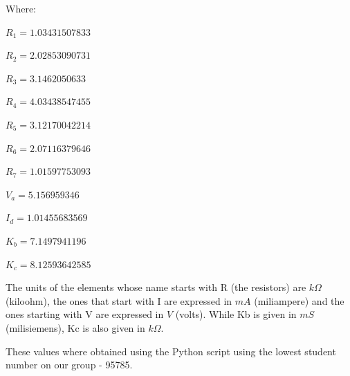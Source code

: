 \begin{center}
Where:

$R_1 = 1.03431507833 $

$R_2 = 2.02853090731$
 
$R_3 = 3.1462050633 $

$R_4 = 4.03438547455$ 

$R_5 = 3.12170042214 $

$R_6 = 2.07116379646 $

$R_7 = 1.01597753093 $

$V_a = 5.156959346 $

$I_d = 1.01455683569 $

$K_b = 7.1497941196 $

$K_c = 8.12593642585 $
\end{center}

The units of the elements whose name starts with R (the resistors) are $k\Omega$ (kiloohm), the ones that start with I are expressed in $mA$ (miliampere) and the ones starting with V are expressed in $V$ (volts). While Kb is given in $mS$ (milisiemens), Kc is also given in $k\Omega$.

These values where obtained using the Python script using the lowest student number on our group - 95785.


